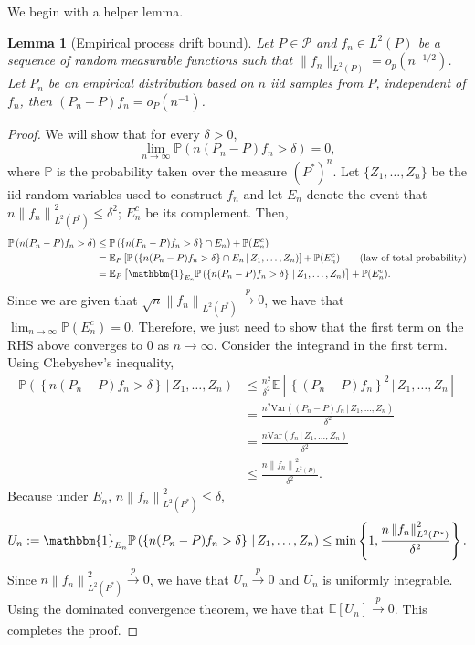 \documentclass{article}
\theoremstyle{plain}
\newtheorem{lemma}[theorem]{Lemma}
\theoremstyle{definition}
\theoremstyle{remark}
\newcommand{\E}{\mathbb{E}}
\newcommand{\Prob}{\mathbb{P}}
\newcommand{\of}[1]{\left(#1\right)}
\newcommand{\off}[1]{\left[#1\right]}
\newcommand{\offf}[1]{\left\{#1\right\}}
\newcommand{\Var}{\text{Var}}
\newcommand{\cP}{\mathcal{P}}
\newcommand{\1}{\mathbbm{1}}
\newcommand{\norm}[1]{\left \| #1 \right \|}
\theoremstyle{plain}
\theoremstyle{definition}
\newcommand{\mymid}{\,|\,}
\begin{document}
We begin with a helper lemma.
\begin{lemma}[Empirical process drift bound]\label{lem:sufficient_condition_for_drift_term}
    Let $P \in \cP$ and $f_n \in L^2(P)$ be a sequence of random measurable functions such that $\|f_n\|_{L^2(P)} = o_p(n^{-1/2})$. Let $P_n$ be an empirical distribution based on $n$ iid samples from $P$, independent of $f_n$, then $(P_n - P)f_n = o_P(n^{-1})$.
\end{lemma}
\begin{proof}
    We will show that for every $\delta > 0$,
    \[
    \lim_{n \to \infty} \Prob\of{n(P_n - P) f_n > \delta} = 0,
    \]
    where $\Prob$ is the probability taken over the measure $(P^*)^n$. Let $\{Z_1, \dots, Z_n\}$ be the iid random variables used to construct $f_n$ and let $E_n$ denote the event that $n\norm{f_n}_{L^2(P^*)}^2 \leq \delta^2$; $E_n^c$ be its complement. Then,
    \begin{align*}
        \Prob\of{n(P_n - P) f_n > \delta} & \leq \Prob\of{\offf{n(P_n - P) f_n > \delta} \cap E_n} + \Prob(E_n^c)\\
        &= \E_{P}\off{\Prob\of{\offf{n(P_n - P) f_n > \delta} \cap E_n \mymid Z_1, \dots, Z_{n}}} + \Prob(E_n^c) \tag{law of total probability}\\
        &= \E_{P}\off{\mathbbm{1}_{E_n}\Prob\of{\offf{n(P_n - P) f_n > \delta}  \mymid Z_1, \dots, Z_{n}}} + \Prob(E_n^c).
    \end{align*}
    Since we are given that $\sqrt{n}\norm{f_n}_{L^2(P^*)} \xrightarrow[]{p} 0$, we have that $\lim_{n \to \infty}\Prob(E_n^c) = 0$. Therefore, we just need to show that the first term on the RHS above converges to 0 as $n \to \infty$. Consider the integrand in the first term. Using Chebyshev's inequality,
    \begin{align*}
    \Prob\of{\offf{n(P_n - P) f_n > \delta}  \mymid Z_1, \dots, Z_{n}} &\leq \frac{n^2}{\delta^2} \E\off{\offf{(P_n - P)f_n}^2 \mymid Z_1, \dots, Z_{n} } \\
    &= \frac{n^2 \Var\of{(P_n - P)f_n \mymid Z_1, \dots, Z_{n}}}{\delta^2}\\
    &= \frac{n \Var\of{f_n \mymid Z_1, \dots, Z_{n} }}{\delta^2}\\
    &\leq \frac{n\norm{f_n}_{L^2(P)}^2}{\delta^2}.
    \end{align*}
    Because under $E_n$, $n \norm{f_n}^2_{L^2(P^*)} \leq \delta$,
    \[
    U_n := \mathbbm{1}_{E_n}\Prob\of{\offf{n(P_n - P) f_n > \delta}  \mymid Z_1, \dots, Z_{n}} \leq \min \offf{1, \frac{n \norm{f_n}_{L^2(P^*)}^2}{\delta^2}}.
    \]
    Since $n \norm{f_n}_{L^2(P^*)}^2 \xrightarrow[]{p} 0$, we have that $U_n \xrightarrow[]{p} 0$ and $U_n$ is uniformly integrable. Using the dominated convergence theorem, we have that $\E[U_n] \xrightarrow[]{p} 0$. This completes the proof.
\end{proof}
\end{document}
